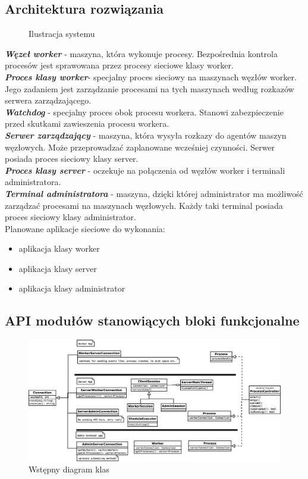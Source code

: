 \documentclass[paper=a4, fontsize=11pt]{scrartcl} %
\begin{document}
\subsection{Architektura rozwiązania}
\begin{figure}[H]
    \centering
    \def\svgwidth{0.5\columnwidth}
    
    \caption{Ilustracja systemu}\label{visina8}
\end{figure}
\textbf{\textit{Węzeł worker}} - maszyna, która wykonuje procesy. Bezpośrednia kontrola procesów jest sprawowana przez procesy sieciowe klasy worker.\\
\textbf{\textit{Proces klasy worker}}- specjalny proces sieciowy na maszynach węzłów worker. Jego zadaniem jest zarządzanie procesami na tych maszynach według rozkazów serwera zarządzającego.\\
\textbf{\textit{Watchdog}} - specjalny proces obok procesu workera. Stanowi zabezpieczenie przed skutkami zawieszenia procesu workera. \\
\textbf{\textit{Serwer zarządzający}} - maszyna, która wysyła rozkazy do agentów maszyn węzłowych. Może przeprowadzać zaplanowane wcześniej czynności. Serwer posiada proces sieciowy klasy server.\\
\textbf{\textit{Proces klasy server}} - oczekuje na połączenia od węzłów worker i terminali administratora.\\
\textbf{\textit{Terminal administratora}} - maszyna, dzięki której administrator ma możliwość zarządzać procesami na maszynach węzłowych. Każdy taki terminal posiada proces sieciowy klasy administrator.\\

Planowane aplikacje sieciowe do wykonania:
\begin{itemize}
\item aplikacja klasy worker
\item aplikacja klasy server
\item aplikacja klasy administrator
\end{itemize}

\subsection{API modułów stanowiących bloki funkcjonalne}
\begin{figure}[H]
	\centering
	\includegraphics[scale=.25]{tin.eps}
	\caption{Wstępny diagram klas}
\end{figure}
\end{document}

